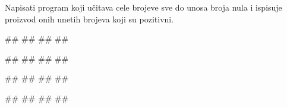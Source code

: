 \begin{Exercise}[label=PET_16] 
Napisati program koji učitava cele brojeve sve do unosa broja nula i ispisuje proizvod onih unetih brojeva koji su
pozitivni.  

\begin{miditest}
\begin{upotreba}{1}
#\naslovInt#
##
##
##
\end{upotreba}
\end{miditest}
\begin{miditest}
\begin{upotreba}{2}
#\naslovInt#
##
##
##
\end{upotreba}
\end{miditest}

\begin{miditest}
\begin{upotreba}{3}
#\naslovInt#
##
##
##
\end{upotreba}
\end{miditest}
\begin{miditest}
\begin{upotreba}{4}
#\naslovInt#
##
##
##
\end{upotreba}
\end{miditest}

\end{Exercise}
\ifresenja
\begin{Answer}[ref=PET_16]
\end{Answer}
\fi


